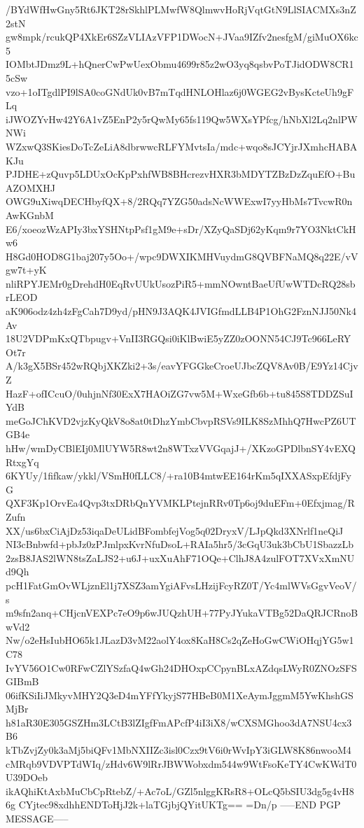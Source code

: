/BYdWfHwGny5Rt6JKT28rSkhlPLMwfW8QlmwvHoRjVqtGtN9LlSIACMXs3nZ2stN
gw8mpk/rcukQP4XkEr6SZzVLIAzVFP1DWocN+JVaa9IZfv2nesfgM/giMuOX6kc5
IOMbtJDmz9L+hQnerCwPwUexObmu4699r85z2wO3yq8qsbvPoTJidODW8CR15cSw
vzo+1oITgdlPI9lSA0coGNdUk0vB7mTqdHNLOHlaz6j0WGEG2vBysKcteUh9gFLq
iJWOZYvHw42Y6A1vZ5EnP2y5rQwMy65fs119Qw5WXsYPfcg/hNbXl2Lq2nlPWNWi
WZxwQ3SKiesDoTcZeLiA8dbrwwcRLFYMvtsIa/mdc+wqo8sJCYjrJXmhcHABAKJu
PJDHE+zQuvp5LDUxOcKpPxhfWB8BHcrezvHXR3bMDYTZBzDzZquEfO+BuAZOMXHJ
OWG9uXiwqDECHbyfQX+8/2RQq7YZG50adsNcWWExwI7yyHbMs7TvcwR0nAwKGnbM
E6/xoeozWzAPIy3bxYSHNtpPsf1gM9e+sDr/XZyQaSDj62yKqm9r7YO3NktCkHw6
H8Gd0HOD8G1baj207y5Oo+/wpc9DWXIKMHVuydmG8QVBFNaMQ8q22E/vVgw7t+yK
nliRPYJEMr0gDrehdH0EqRvUUkUsozPiR5+mmNOwntBaeUfUwWTDcRQ28sbrLEOD
aK906odz4zh4zFgCah7D9yd/pHN9J3AQK4JVIGfmdLLB4P1OhG2FznNJJ50Nk4Av
18U2VDPmKxQTbpugv+VnII3RGQsi0iKlBwiE5yZZ0zOONN54CJ9Tc966LeRYOt7r
A/k3gX5BSr452wRQbjXKZki2+3s/eavYFGGkeCroeUJbcZQV8Av0B/E9Yz14CjvZ
HazF+ofICcuO/0uhjnNf30ExX7HAOiZG7vw5M+WxeGfb6b+tu845S8TDDZSuIYdB
meGoJChKVD2vjzKyQkV8o8at0tDhzYmbCbvpRSVs9ILK8SzMhhQ7HwcPZ6UTGB4e
hHw/wmDyCBlEIj0MlUYW5R8wt2n8WTxzVVGqajJ+/XKzoGPDlbnSY4vEXQRtxgYq
6KYUy/1fifkaw/ykkl/VSmH0fLLC8/+ra10B4mtwEE164rKm5qIXXASxpEfdjFyG
QXF3Kp1OrvEa4Qvp3txDRbQnYVMKLPtejnRRv0Tp6oj9duEFm+0Efxjmag/RZufn
XX/us6bxCiAjDz53iqaDeULidBFombfejVog5q02DryxV/LJpQkd3XNrlf1neQiJ
NI3cBnbwfd+pbJz0zPJmlpxKvrNfuDsoL+RAIa5hr5/3cGqU3uk3bCbU1SbazzLb
2zsB8JAS2lWN8tsZaLJS2+u6J+uxXuAhF71OQe+ClhJ8A4zulFOT7XVxXmNUd9Qh
pcH1FatGmOvWLjznEl1j7XSZ3amYgiAFvsLHzijFcyRZ0T/Yc4mlWVsGgvVeoV/s
m9sfn2anq+CHjcnVEXPc7eO9p6wJUQzhUH+77PyJYukaVTBg52DaQRJCRnoBwVd2
Nw/o2eHsIubHO65k1JLazD3vM22aolY4ox8KaH8Cs2qZeHoGwCWiOHqjYG5w1C78
IvYV56O1Cw0RFwCZlYSzfaQ4wGh24DHOxpCCpynBLxAZdqsLWyR0ZNOzSFSGIBmB
06ifKSiIiJMkyvMHY2Q3eD4mYFfYkyjS77HBeB0M1XeAymJggmM5YwKhshGSMjBr
h81aR30E305GSZHm3LCtB3lZIgfFmAPcfP4iI3iX8/wCXSMGhoo3dA7NSU4cx3B6
kTbZvjZy0k3aMj5biQFv1MbNXIIZc3isl0Czx9tV6i0rWvIpY3iGLW8K86nwooM4
cMRqb9VDVPTdWIq/zHdv6W9lRrJBWWobxdm544w9WtFsoKeTY4CwKWdT0U39DOeb
ikAQhiKtAxbMuCbCpRtebZ/+Ac7oL/GZl5nlggKRsR8+OLcQ5bSIU3dg5g4vH86g
CYjtec98xdhhENDToHjJ2k+laTGjbjQYitUKTg==
=Dn/p
-----END PGP MESSAGE-----
